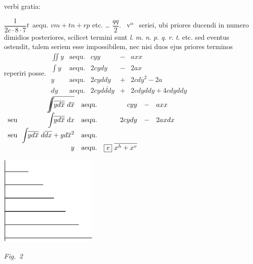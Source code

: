 %
verbi gratia:\rule[-4mm]{0pt}{16,0mm}
%
$\dfrac{1}{2c \cdot 8 \cdot 7}t$\, aequ. $vm + tn + rp$ etc. … $\dfrac{qq}{2}.$
%
~v\textsuperscript{o}\rbrack\ %
%
\pend
\vspace{2mm}
%
%
\pstart
{}
% 
seriei,\protect{} ubi 
%
%
priores ducendi in numero dimidios posteriores,
scilicet termini sunt 
\textit{l}. \textit{m}. \textit{n}. \textit{p}. \textit{q}. \textit{r}. \textit{t}. etc.
sed eventus\protect{} ostendit,
talem seriem esse impossibilem,\protect{}
nec nisi duos ejus priores terminos reperiri posse.%
\protect{}
\pend
\vspace{0.5em}
%
%
\pstart
\centering
\renewcommand{\arraystretch}{1.5}
\setlength{\arraycolsep}{3pt}
$\begin{array}{rcrcl}
\!\!\displaystyle\iint\!\!\!y & \text{aequ.} & cyy & - & axx \\ 
\!\!\displaystyle\int\!\!\!y & \text{aequ.} & 2cydy & - & 2ax \\ 
 y & \text{aequ.} & 2cyddy & + & 2cd\overline{y}^2 - 2a \\ 
dy & \text{aequ.} & 2cy\overline{dddy} & + & 2cdyddy + 4cdyddy
\end{array}$
\setlength{\arraycolsep}{3pt}
$\begin{array}{lrcrcl}
& \!\!\displaystyle\int\!\!\overline{\!\!\!\!\displaystyle\int\!\!\overline{yd\overline{x}}\ d\overline{x}} & \text{aequ.} & cyy & - & axx \\
\text{seu} & \!\!\displaystyle\int\!\!\overline{yd\overline{x}}\ dx & \text{aequ.} & 2cydy & - & 2axdx \\
\text{seu} & \!\!\displaystyle\int\!\!\overline{yd\overline{x}}\ d\overline{dx} + yd\overline{x}^2 & \text{aequ.} & & & \\
& y & \text{aequ.} & \protect\framebox{\textit{e}}\ \overline{x^h + x^v} &&
\end{array}$
\pend%
\count{}
\count{}
\count{}
%
%
  \vspace{2.5em}%
  \centerline{\includegraphics[width=0.36\textwidth]{gesamttex/edit_VIII,3/images/LH_35_09_14_001-002_d2.pdf}}%
  \vspace*{1.0em}
  \centerline{\lbrack\textit{Fig.~2}\rbrack}%
  \label{LH_35_09_14_002v_Fig.2}%
%
%
